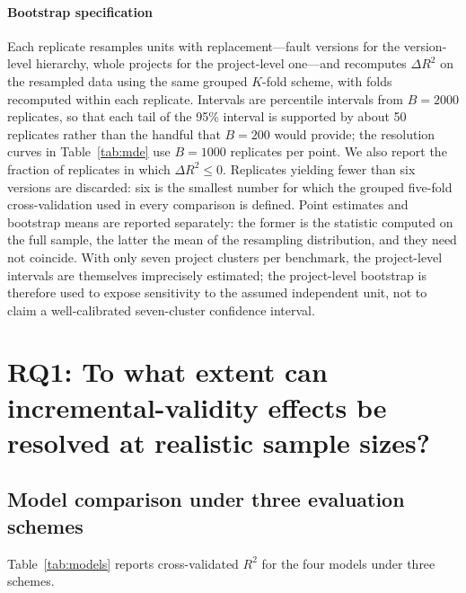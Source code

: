 \documentclass[preprint,12pt]{elsarticle}
\begin{document}
\paragraph{Bootstrap specification} Each replicate resamples units with
replacement---fault versions for the version-level hierarchy, whole
projects for the project-level one---and recomputes $\Delta R^2$ on the
resampled data using the same grouped $K$-fold scheme, with folds
recomputed within each replicate. Intervals are percentile intervals from
$B = 2000$ replicates, so that each tail of the 95\% interval is supported
by about 50 replicates rather than the handful that $B = 200$ would
provide; the resolution curves in Table~\ref{tab:mde} use $B = 1000$
replicates per point. We also report the fraction of replicates in which
$\Delta R^2 \le 0$. Replicates yielding fewer than six versions are
discarded: six is the smallest number for which the grouped five-fold
cross-validation used in every comparison is defined. Point estimates and
bootstrap means are reported separately: the former is the statistic
computed on the full sample, the latter the mean of the resampling
distribution, and they need not coincide. With only seven project clusters
per benchmark, the project-level intervals are themselves imprecisely
estimated; the project-level bootstrap is therefore used to expose
sensitivity to the assumed independent unit, not to claim a well-calibrated
seven-cluster confidence interval.

\section{RQ1: To what extent can incremental-validity effects be resolved
at realistic sample sizes?}
\label{sec:rq1}

\subsection{Model comparison under three evaluation schemes}

Table~\ref{tab:models} reports cross-validated $R^2$ for the four models
under three schemes.
\end{document}
